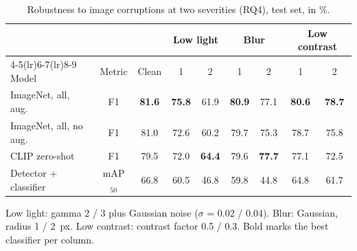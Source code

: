 \begin{table}[H]
\centering
\caption{Robustness to image corruptions at two severities (RQ4), test set, in \%.}
\label{tab:robustness}
\begin{threeparttable}
\small
\begin{tabular}{lcccccccc}
\toprule
 & & & \multicolumn{2}{c}{Low light} & \multicolumn{2}{c}{Blur} & \multicolumn{2}{c}{Low contrast} \\
\cmidrule(lr){4-5}\cmidrule(lr){6-7}\cmidrule(lr){8-9}
Model & Metric & Clean & 1 & 2 & 1 & 2 & 1 & 2 \\
\midrule
ImageNet, all, aug. & F1 & \textbf{81.6} & \textbf{75.8} & 61.9 & \textbf{80.9} & 77.1 & \textbf{80.6} & \textbf{78.7} \\
ImageNet, all, no aug. & F1 & 81.0 & 72.6 & 60.2 & 79.7 & 75.3 & 78.7 & 75.8 \\
CLIP zero-shot & F1 & 79.5 & 72.0 & \textbf{64.4} & 79.6 & \textbf{77.7} & 77.1 & 72.5 \\
\midrule
Detector + classifier & mAP$_{50}$ & 66.8 & 60.5 & 46.8 & 59.8 & 44.8 & 64.8 & 61.7 \\
\bottomrule
\end{tabular}
\par\smallskip
{\footnotesize\noindent Low light: gamma 2 / 3 plus Gaussian noise ($\sigma$ = 0.02 / 0.04). Blur: Gaussian, radius 1 / 2~px. Low contrast: contrast factor 0.5 / 0.3. Bold marks the best classifier per column.\par}
\end{threeparttable}
\end{table}
